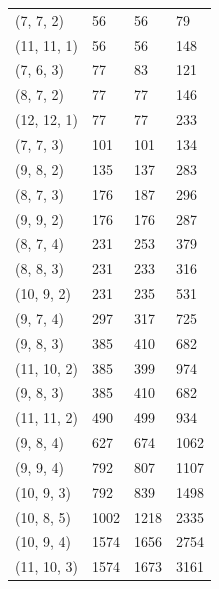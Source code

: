 \documentclass{amsart}
\numberwithin{equation}{section}
\numberwithin{figure}{section}
\numberwithin{table}{section}
\theoremstyle{definition}
\begin{document}
\begin{figure}
\begin{tabular}{|p{2cm}||p{3cm}|p{3cm}|p{3cm}|}
(7, 7, 2)   & 56   & 56   & 79   \\

(11, 11, 1) & 56   & 56   & 148  \\

(7, 6, 3)   & 77   & 83   & 121  \\

(8, 7, 2)   & 77   & 77   & 146  \\

(12, 12, 1) & 77   & 77   & 233  \\

(7, 7, 3)   & 101  & 101  & 134  \\

(9, 8, 2)   & 135  & 137  & 283  \\

(8, 7, 3)   & 176  & 187  & 296  \\

(9, 9, 2)   & 176  & 176  & 287  \\

(8, 7, 4)   & 231  & 253  & 379  \\

(8, 8, 3)   & 231  & 233  & 316  \\

(10, 9, 2)  & 231  & 235  & 531  \\

(9, 7, 4)   & 297  & 317  & 725  \\

(9, 8, 3)   & 385  & 410  & 682  \\

(11, 10, 2) & 385  & 399  & 974  \\

(9, 8, 3)   & 385  & 410  & 682  \\

(11, 11, 2) & 490  & 499  & 934  \\

(9, 8, 4)   & 627  & 674  & 1062 \\

(9, 9, 4)   & 792  & 807  & 1107 \\

(10, 9, 3)  & 792  & 839  & 1498 \\

(10, 8, 5)  & 1002 & 1218 & 2335 \\

(10, 9, 4)  & 1574 & 1656 & 2754 \\

(11, 10, 3) & 1574 & 1673 & 3161 \\


\end{tabular}
\end{figure}
\end{document}
